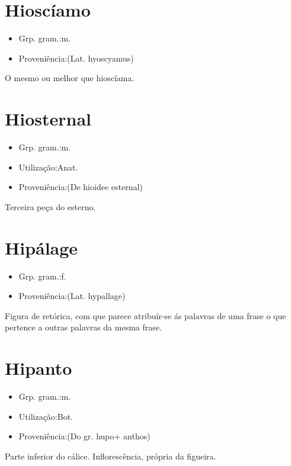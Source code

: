 \documentclass{article}
\begin{document}
\section{Hioscíamo}
\begin{itemize}
\item {Grp. gram.:m.}
\end{itemize}
\begin{itemize}
\item {Proveniência:(Lat. \textunderscore hyoscyamus\textunderscore )}
\end{itemize}
O mesmo ou melhor que \textunderscore hioscíama\textunderscore .
\section{Hiosternal}
\begin{itemize}
\item {Grp. gram.:m.}
\end{itemize}
\begin{itemize}
\item {Utilização:Anat.}
\end{itemize}
\begin{itemize}
\item {Proveniência:(De \textunderscore hioide\textunderscore  e \textunderscore esternal\textunderscore )}
\end{itemize}
Terceira peça do esterno.
\section{Hipálage}
\begin{itemize}
\item {Grp. gram.:f.}
\end{itemize}
\begin{itemize}
\item {Proveniência:(Lat. \textunderscore hypallage\textunderscore )}
\end{itemize}
Figura de retórica, com que parece atribuír-se ás palavras de uma frase o que pertence a outras palavras da mesma frase.
\section{Hipanto}
\begin{itemize}
\item {Grp. gram.:m.}
\end{itemize}
\begin{itemize}
\item {Utilização:Bot.}
\end{itemize}
\begin{itemize}
\item {Proveniência:(Do gr. \textunderscore hupo\textunderscore  + \textunderscore anthos\textunderscore )}
\end{itemize}
Parte inferior do cálice.
Inflorescência, própria da figueira.
\end{document}
